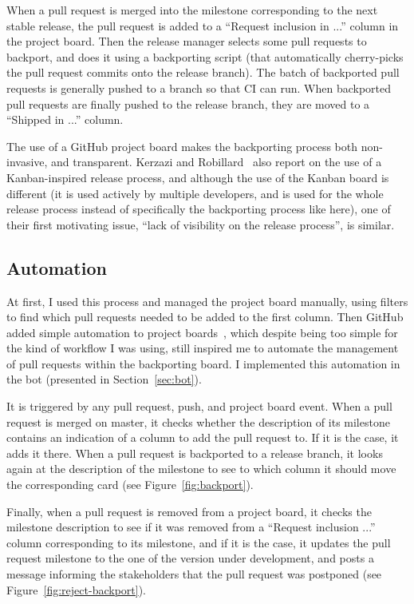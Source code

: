 When a pull request is merged into the milestone corresponding to the next stable release, the pull request is added to a ``Request inclusion in ...'' column in the project board.
Then the release manager selects some pull requests to backport, and does it using a backporting script (that automatically cherry-picks the pull request commits onto the release branch).
The batch of backported pull requests is generally pushed to a branch so that CI can run.
When backported pull requests are finally pushed to the release branch, they are moved to a ``Shipped in ...'' column.

The use of a GitHub project board makes the backporting process both non-invasive, and transparent.
Kerzazi and Robillard~\cite{kerzazi2013kanbanize} also report on the use of a Kanban-inspired release process, and although the use of the Kanban board is different (it is used actively by multiple developers, and is used for the whole release process instead of specifically the backporting process like here), one of their first motivating issue, ``lack of visibility on the release process'', is similar.

\subsection{Automation}

At first, I used this process and managed the project board manually, using filters to find which pull requests needed to be added to the first column.
Then GitHub added simple automation to project boards~\cite{github_project_automation}, which despite being too simple for the kind of workflow I was using, still inspired me to automate the management of pull requests within the backporting board.
I implemented this automation in the bot (presented in Section~\ref{sec:bot}).

It is triggered by any pull request, push, and project board event.
When a pull request is merged on master, it checks whether the description of its milestone contains an indication of a column to add the pull request to.
If it is the case, it adds it there.
When a pull request is backported to a release branch, it looks again at the description of the milestone to see to which column it should move the corresponding card (see Figure~\ref{fig:backport}).

Finally, when a pull request is removed from a project board, it checks the milestone description to see if it was removed from a ``Request inclusion ...'' column corresponding to its milestone, and if it is the case, it updates the pull request milestone to the one of the version under development, and posts a message informing the stakeholders that the pull request was postponed (see Figure~\ref{fig:reject-backport}).

